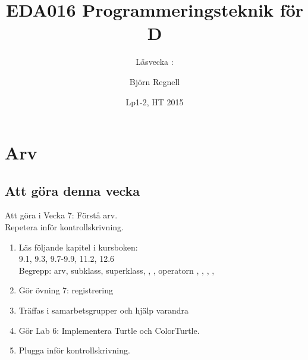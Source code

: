 \documentclass{lecturenotes}
\title[Föreläsningsanteckningar EDA016, 2015]{EDA016 Programmeringsteknik för D}
\subtitle{Läsvecka \vecka: \tema}
\author{Björn Regnell}
\institute{Datavetenskap, LTH}
\date{Lp1-2, HT 2015}
\renewcommand{\vecka}{7}
\newcommand{\tema}{Arv}
\begin{document}
\frame{\titlepage}
\setnextsection{\vecka}
\section[Vecka \vecka: \tema]{\tema}
\frame{\tableofcontents}

\subsection{Att göra denna vecka}
\begin{Slide}{Att göra i Vecka \vecka: Förstå arv. \\Repetera inför kontrollskrivning.}
\begin{enumerate}
\item Läs följande kapitel i kursboken:\\ 9.1, 9.3, 9.7-9.9, 11.2, 12.6 \\  
Begrepp: arv, subklass, superklass, ,  , operatorn , ,  ,  ,
\item Gör övning 7: registrering
\item Träffas i samarbetsgrupper och hjälp varandra 
\item Gör Lab 6: Implementera Turtle och ColorTurtle.
\item Plugga inför  kontrollskrivning.
\end{enumerate}
\end{Slide}
\end{document}

